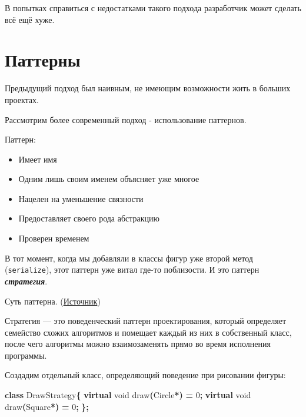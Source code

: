 \documentclass[14pt,a4paper]{article}
\providecommand{\tightlist}{%
	\setlength{\itemsep}{0pt}\setlength{\parskip}{0pt}}
\newenvironment{Shaded}{\begin{paragraph}}{\end{paragraph}}
\newenvironment{Highlighting}{\begin{paragraph}}{\end{paragraph}}
\newcommand{\KeywordTok}[1]{\textcolor[rgb]{0.13,0.29,0.53}{\textbf{#1}}}
\newcommand{\DataTypeTok}[1]{\textcolor[rgb]{0.13,0.29,0.53}{#1}}
\newcommand{\DecValTok}[1]{\textcolor[rgb]{0.00,0.00,0.81}{#1}}
\newcommand{\OperatorTok}[1]{\textcolor[rgb]{0.81,0.36,0.00}{\textbf{#1}}}
\newcommand{\NormalTok}[1]{#1}
\begin{document}
В попытках справиться с недостатками такого подхода разработчик может
сделать всё ещё хуже.

\hypertarget{ux43fux430ux442ux442ux435ux440ux43dux44b}{%
\section{Паттерны}\label{ux43fux430ux442ux442ux435ux440ux43dux44b}}

Предыдущий подход был наивным, не имеющим возможности жить в больших
проектах.

Рассмотрим более современный подход - использование паттернов.

Паттерн:

\begin{itemize}
\tightlist
\item
  Имеет имя
\item
  Одним лишь своим именем объясняет уже многое
\item
  Нацелен на уменьшение связности
\item
  Предоставляет своего рода абстракцию
\item
  Проверен временем
\end{itemize}

В тот момент, когда мы добавляли в классы фигур уже второй метод
(\texttt{serialize}), этот паттерн уже витал где-то поблизости. И это
паттерн \textbf{\emph{стратегия}}.

Суть паттерна. (\href{refactoring.guru}{Источник})

Стратегия --- это поведенческий паттерн проектирования, который
определяет семейство схожих алгоритмов и помещает каждый из них в
собственный класс, после чего алгоритмы можно взаимозаменять прямо во
время исполнения программы.

Создадим отдельный класс, определяющий поведение при рисовании фигуры:

\begin{Shaded}
\begin{Highlighting}[]
\KeywordTok{class}\NormalTok{ DrawStrategy}\OperatorTok{\{}
    \KeywordTok{virtual} \DataTypeTok{void}\NormalTok{ draw}\OperatorTok{(}\NormalTok{Circle}\OperatorTok{*)} \OperatorTok{=} \DecValTok{0}\OperatorTok{;}
    \KeywordTok{virtual} \DataTypeTok{void}\NormalTok{ draw}\OperatorTok{(}\NormalTok{Square}\OperatorTok{*)} \OperatorTok{=} \DecValTok{0}\OperatorTok{;}
\OperatorTok{\};}
\end{Highlighting}
\end{Shaded}
\end{document}
